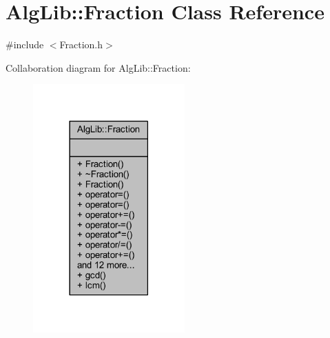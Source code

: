 \hypertarget{class_alg_lib_1_1_fraction}{}\section{Alg\+Lib\+:\+:Fraction Class Reference}
\label{class_alg_lib_1_1_fraction}


{\ttfamily \#include $<$Fraction.\+h$>$}



Collaboration diagram for Alg\+Lib\+:\+:Fraction\+:\nopagebreak
\begin{figure}[H]
\begin{center}
\leavevmode
\includegraphics[width=165pt]{class_alg_lib_1_1_fraction__coll__graph}
\end{center}
\end{figure}
